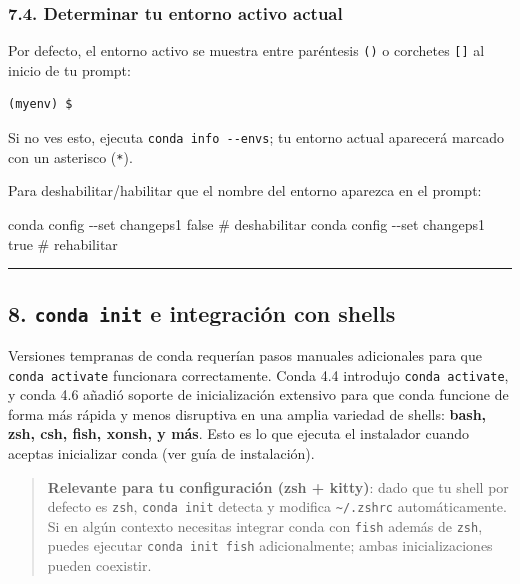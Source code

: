 \documentclass[
  doc,
  floatsintext,
  longtable,
  a4paper,
  nolmodern,
  notxfonts,
  notimes,
  12pt,
  colorlinks=true,linkcolor=blue,citecolor=blue,urlcolor=blue]{apa7}
\newenvironment{Shaded}{\begin{snugshade}}{\end{snugshade}}
\newcommand{\AttributeTok}[1]{\textcolor[rgb]{0.40,0.45,0.13}{#1}}
\newcommand{\CommentTok}[1]{\textcolor[rgb]{0.37,0.37,0.37}{#1}}
\newcommand{\ExtensionTok}[1]{\textcolor[rgb]{0.00,0.23,0.31}{#1}}
\newcommand{\NormalTok}[1]{\textcolor[rgb]{0.00,0.23,0.31}{#1}}
\begin{document}
\subsubsection{7.4. Determinar tu entorno activo
actual}\label{determinar-tu-entorno-activo-actual}

Por defecto, el entorno activo se muestra entre paréntesis \texttt{()} o
corchetes \texttt{{[}{]}} al inicio de tu prompt:

\begin{verbatim}
(myenv) $
\end{verbatim}

Si no ves esto, ejecuta \texttt{conda\ info\ -\/-envs}; tu entorno
actual aparecerá marcado con un asterisco (\texttt{*}).

Para deshabilitar/habilitar que el nombre del entorno aparezca en el
prompt:

\begin{Shaded}
\begin{Highlighting}[]
\ExtensionTok{conda}\NormalTok{ config }\AttributeTok{{-}{-}set}\NormalTok{ changeps1 false   }\CommentTok{\# deshabilitar}
\ExtensionTok{conda}\NormalTok{ config }\AttributeTok{{-}{-}set}\NormalTok{ changeps1 true    }\CommentTok{\# rehabilitar}
\end{Highlighting}
\end{Shaded}

\begin{center}\rule{0.5\linewidth}{0.5pt}\end{center}

\subsection{\texorpdfstring{8. \texttt{conda\ init} e integración con
shells}{8. conda init e integración con shells}}\label{conda-init-e-integraciuxf3n-con-shells}

Versiones tempranas de conda requerían pasos manuales adicionales para
que \texttt{conda\ activate} funcionara correctamente. Conda 4.4
introdujo \texttt{conda\ activate}, y conda 4.6 añadió soporte de
inicialización extensivo para que conda funcione de forma más rápida y
menos disruptiva en una amplia variedad de shells: \textbf{bash, zsh,
csh, fish, xonsh, y más}. Esto es lo que ejecuta el instalador cuando
aceptas inicializar conda (ver guía de instalación).

\begin{quote}
\textbf{Relevante para tu configuración (zsh + kitty)}: dado que tu
shell por defecto es \texttt{zsh}, \texttt{conda\ init} detecta y
modifica \texttt{\textasciitilde{}/.zshrc} automáticamente. Si en algún
contexto necesitas integrar conda con \texttt{fish} además de
\texttt{zsh}, puedes ejecutar \texttt{conda\ init\ fish} adicionalmente;
ambas inicializaciones pueden coexistir.
\end{quote}
\end{document}
